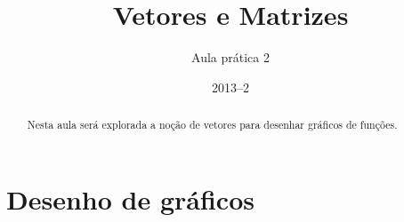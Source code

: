 \documentclass[11pt]{practice}
\begin{document}
\subtitle{Aula prática 2}
\title{Vetores e Matrizes}
\date{2013--2}
\maketitle

\begin{abstract}
  Nesta aula será explorada a noção de vetores para desenhar gráficos de
  funções.
\end{abstract}

\tableofcontents


\section{Desenho de gráficos}
\end{document}
